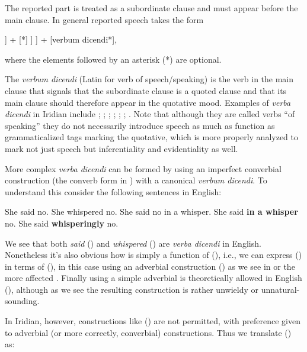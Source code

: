 The reported part is treated as a subordinate clause and must appear before the main clause. In general reported speech takes the form

\ex\label{ex:repstruct}{\small
\bigg[ \Big[ \big[ [TOP*] [PRED in quotative mood] \big] + [*] \Big] \bigg] + [verbum dicendi*],
}\xe

where the elements followed by an asterisk (*) are optional.

The \emph{verbum dicendi} (Latin for verb of speech/speaking) is the verb in the main clause that signals that the subordinate clause is a quoted clause and that its main clause should therefore appear in the quotative mood. Examples of \emph{verba dicendi} in Iridian include ; ; ; ; ; ; . Note that although they are called verbs ``of speaking'' they do not necessarily introduce speech as much as function as grammaticalized tags marking the quotative,  which is more properly analyzed to mark not just speech but inferentiality and evidentiality as well.

More complex \emph{verba dicendi} can be formed by using an imperfect converbial construction (the converb form in ) with a canonical \emph{verbum dicendi}. To understand this consider the following sentences in English:

\pex[*=?*]
\a She said no.
\a She whispered no.
\a She said no in a whisper.
\a {} She said \textbf{in a whisper} no.
\a {} She said \textbf{whisperingly} no.
\xe

\smallskip

We see that both \emph{said} () and \emph{whispered} () are \emph{verba dicendi} in English. Nonetheless it's also obvious how  is simply a function of (), i.e., we can express () in terms of (), in this case using an adverbial construction () as we see in  or the more affected . Finally using a simple adverbial is theoretically allowed in English (), although as we see the resulting construction is rather unwieldy or unnatural-sounding.

In Iridian, however, constructions like () are not permitted, with preference given to adverbial (or more correctly, converbial) constructions. Thus we translate () as:

